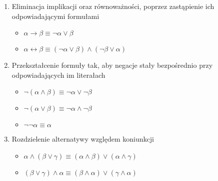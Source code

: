\documentclass[11pt,a4paper]{article}
\begin{document}
\begin{enumerate}
	\item Eliminacja implikacji oraz równoważności, poprzez zastąpienie ich 			odpowiadającymi formułami 
		\begin{itemize}
			\item $\alpha \rightarrow \beta \equiv \neg\alpha \vee \beta$
			\item $\alpha \leftrightarrow \beta \equiv (\neg\alpha \vee \beta) \wedge (\neg\beta \vee \alpha)$
		\end{itemize}
	\item Przekształcenie formuły tak, aby negacje stały bezpośrednio przy odpowiadających im literałach
		\begin{itemize}
			\item $\neg(\alpha \wedge \beta) \equiv \neg\alpha \vee \neg\beta$
			\item $\neg(\alpha \vee \beta) \equiv \neg\alpha \wedge \neg\beta$
			\item $\neg\neg\alpha \equiv \alpha$
		\end{itemize}
		\item Rozdzielenie alternatywy względem koniunkcji
		\begin{itemize}
			\item $\alpha \wedge (\beta \vee \gamma) \equiv (\alpha \wedge \beta) \vee (\alpha \wedge \gamma)$
			\item $(\beta \vee \gamma) \wedge \alpha \equiv (\beta \wedge \alpha) \vee (\gamma \wedge \alpha)$
		\end{itemize}
\end{enumerate}

\end{document}
